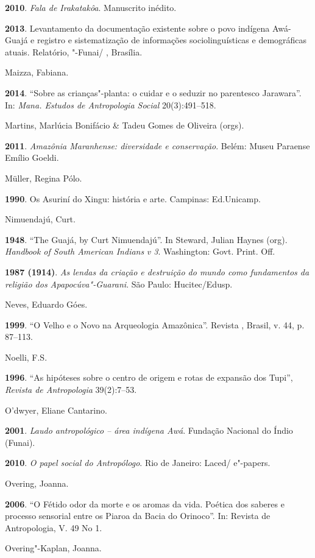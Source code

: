 \textbf{2010}. \emph{Fala de Irakatakôa}. Manuscrito inédito.

\textbf{2013}. Levantamento da documentação existente sobre o povo
indígena Awá-Guajá e registro e sistematização de informações
sociolinguísticas e demográficas atuais. Relatório, "-Funai/ ,
Brasília.

Maizza, Fabiana.

\textbf{2014}. ``Sobre as crianças"-planta: o cuidar e o seduzir no
parentesco Jarawara''. In: \emph{Mana. Estudos de Antropologia Social}
20(3):491--518.

Martins, Marlúcia Bonifácio \& Tadeu Gomes de Oliveira (orgs).

\textbf{2011}. \emph{Amazônia Maranhense: diversidade e conservação}.
Belém: Museu Paraense Emílio Goeldi.

Müller, Regina Pólo.

\textbf{1990}. Os Asuriní do Xingu: história e arte. Campinas:
Ed.Unicamp.

Nimuendajú, Curt.

\textbf{1948}. ``The Guajá, by Curt Nimuendajú''. In Steward, Julian
Haynes (org). \emph{Handbook of South American Indians} \emph{v 3}.
Washington: Govt. Print. Off.

\textbf{1987 (1914)}. \emph{As lendas da criação e destruição do mundo
como fundamentos da religião dos Apapocúva"-Guarani}. São Paulo:
Hucitec/Edusp.

Neves, Eduardo Góes.

\textbf{1999}. ``O Velho e o Novo na Arqueologia Amazônica''. Revista
, Brasil, v. 44, p. 87--113.

Noelli, F.S.

\textbf{1996}. ``As hipóteses sobre o centro de origem e rotas de
expansão dos Tupi'', \emph{Revista de Antropologia} 39(2):7--53.

O'dwyer, Eliane Cantarino.

\textbf{2001}. \emph{Laudo antropológico -- área indígena Awá}. Fundação
Nacional do Índio (Funai).

\textbf{2010}. \emph{O papel social do Antropólogo}. Rio de Janeiro:
Laced/ e"-papers.

Overing, Joanna.

\textbf{2006}. ``O Fétido odor da morte e os aromas da vida. Poética dos
saberes e processo sensorial entre os Piaroa da Bacia do Orinoco''. In:
Revista de Antropologia, V. 49 No 1.

Overing"-Kaplan, Joanna.

